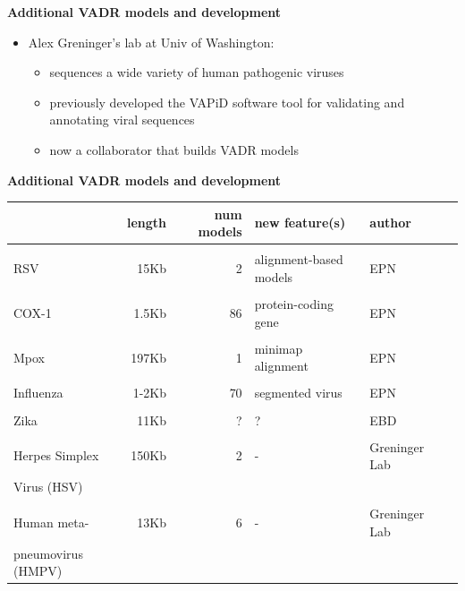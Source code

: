 \documentclass[landscape]{slides}
\begin{document}
\begin{slide}
\begin{center}
  \textbf{Additional VADR models and development}
\end{center}

\begin{itemize}
  \item Alex Greninger's lab at Univ of Washington:
    \begin {itemize}
    \item sequences a wide variety of human pathogenic viruses
    \item previously developed the VAPiD software tool for validating
      and annotating viral sequences
    \item now a collaborator that builds VADR models
  \end{itemize}
\end{itemize}

  \vfill
\end{slide}
\begin{slide}
\begin{center}
  \textbf{Additional VADR models and development}

\small
\begin{tabular}{l|r|r|l|l|l}
 & length & num models & new feature(s) & author\\ \hline
 & & & & & \\ 
RSV & 15Kb & 2 & alignment-based models & EPN \\
 & & & & & \\ 
COX-1 & 1.5Kb & 86 & protein-coding gene & EPN \\
 & & & & & \\ 
Mpox & 197Kb & 1 & minimap alignment & EPN \\
 & & & & & \\ 
Influenza & 1-2Kb & 70 & segmented virus & EPN \\
 & & & & & \\ 
Zika      & 11Kb & ? & ? & EBD \\
 & & & & & \\ 
Herpes Simplex & 150Kb & 2 & - & Greninger Lab \\
Virus (HSV) &  &  &  & \\
 & & & & & \\ 
Human meta- & 13Kb & 6 & - & Greninger Lab \\
pneumovirus (HMPV) &  &  &  &  \\
\end{tabular}

\end{center}
  \vfill
\end{slide}
\end{document}
